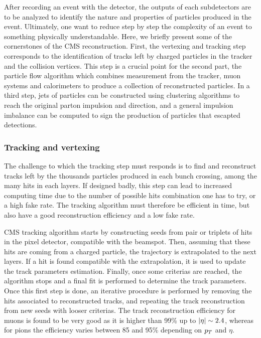         After recording an event with the detector, the outputs of each subdetectors
        are to be analyzed to identify the nature and properties of particles produced in the
        event. Ultimately, one want to reduce step by step the complexity of an event to
        something physically understandable. Here, we briefly present some of the
        cornerstones of the CMS reconstruction. First, the vertexing and tracking step
        corresponds to the identification of tracks left by charged particles in the tracker
        and the collision vertices. This step is a crucial point for the second part, the
        particle flow algorithm which combines measurement from the tracker, muon systems
        and calorimeters to produce a collection of reconstructed particles. In a third step,
        jets of particles can be constructed using clustering algorithms to reach the original
        parton impulsion and direction, and a general impulsion imbalance can be computed
        to sign the production of particles that escapted detections.

            \subsubsection{Tracking and vertexing \label{sec:trackingAndVertexing}}

        The challenge to which the tracking step must responds is to find and reconstruct
        tracks left by the thousands particles produced in each bunch crossing, among the
        many hits in each layers. If designed badly, this step can lead to increased
        computing time due to the number of possible hits combination one has to try,
        or a high fake rate. The tracking algorithm must therefore be efficient in time,
        but also have a good reconstruction efficiency and a low fake rate.

        CMS tracking algorithm starts by constructing seeds from pair or triplets of hits
        in the pixel detector, compatible with the beamspot. Then, assuming that these
        hits are coming from a charged particle, the trajectory is extrapolated to the
        next layers. If a hit is found compatible with the extrapolation, it is used to
        update the track parameters estimation. Finally, once some criterias are reached,
        the algorithm stops and a final fit is performed to determine the track parameters.
        Once this first step is done, an iterative procedure is performed by removing the
        hits associated to reconstructed tracks, and repeating the track reconstruction
        from new seeds with looser criterias.
        The track reconstruction efficiency for muons is found to be very good as it is
        higher than 99\% up to $\left| \eta \right| \sim 2.4$, whereas for pions the efficiency varies
        between 85 and 95\% depending on $p_T$ and $\eta$.

